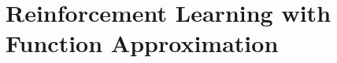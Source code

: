 \documentclass[12pt]{book}
\begin{document}

% 


% 
% 

\setcounter{chapter}{7}
\chapter{Reinforcement Learning with Function Approximation}



%

%
%
\end{document}
